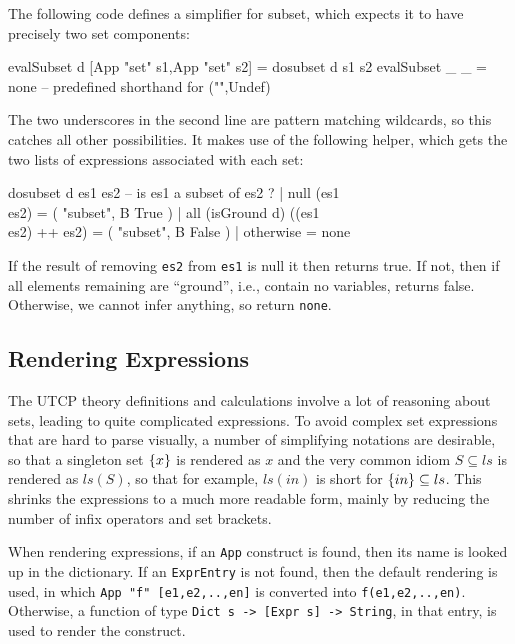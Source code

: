 The following code defines a simplifier for subset,
which expects it to have precisely two set components:
\begin{code}
evalSubset d [App "set" s1,App "set" s2] = dosubset d s1 s2
evalSubset _ _ = none -- predefined shorthand for ("",Undef)
\end{code}
The two underscores in the second line are pattern matching
wildcards, so this catches all other possibilities.
It makes use of the following helper,
which gets the two lists of expressions associated with each set:
\begin{code}
dosubset d es1 es2 -- is es1 a subset of es2 ?
  | null (es1 \\ es2)  =  ( "subset", B True )
  | all (isGround d) ((es1 \\ es2) ++ es2)
                       =  ( "subset", B False )
  | otherwise          =  none
\end{code}
If the result of removing \texttt{es2} from \texttt{es1} is null 
it then returns true.
If not, then if all elements remaining are ``ground'',
i.e., contain no variables, returns false.
Otherwise, we cannot infer anything, so return \texttt{none}.

\subsection{Rendering Expressions}

The UTCP theory definitions and calculations
involve a lot of reasoning about sets,
leading to quite complicated expressions.
To avoid complex set expressions that are hard to parse visually,
a number of simplifying notations are desirable,
so that a singleton set $\{{x}\}$ is rendered as $x$
and the very common idiom $S \subseteq ls$
is rendered as $ls(S)$,
so that for example, $ls(in)$ is short for $\{{in}\} \subseteq ls$.
This shrinks the expressions to a much more readable form,
mainly by reducing the number of infix operators and set brackets.


When rendering expressions,
if an \texttt{App} construct is found, then its name
is looked up in the dictionary.
If an \texttt{ExprEntry} is not found, then the default rendering is used,
in which \verb$App "f" [e1,e2,..,en]$
is converted into \verb$f(e1,e2,..,en)$.
Otherwise, a function of type \verb$Dict s -> [Expr s] -> String$,
in that entry, is used to render the construct.

